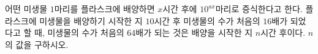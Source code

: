 어떤 미생물 $1$마리를 플라스크에 배양하면 $x$시간 후에 $10^{ax}$마리로 증식한다고 한다. 플라스크에 미생물을 배양하기 시작한 지 $10$시간 후 미생물의 수가 처음의 $16$배가 되었다고 할 때, 미생물의 수가 처음의 $64$배가 되는 것은 배양을 시작한 지 $n$시간 후이다. $n$의 값을 구하시오. 
